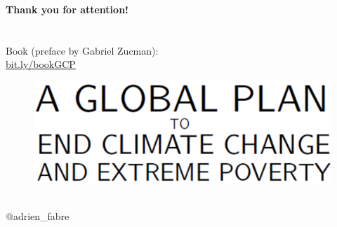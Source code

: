 \documentclass[aspectratio=169,xcolor=dvipsnames, 11pt,mathserif]{beamer}
\begin{document}
\begin{frame}{}
\centering \Large \textbf{Thank you for attention!}
% 
~\\ \quad \\ \quad \\ %
Book (preface by Gabriel Zucman): \\ \href{https://bit.ly/bookGCP}{bit.ly/bookGCP}
\begin{figure}
    \includegraphics[height=.37\textheight]{../book/cover_en_title.PNG} 
\end{figure}    
~\\ @adrien\_fabre 
\end{frame}


\end{document}
